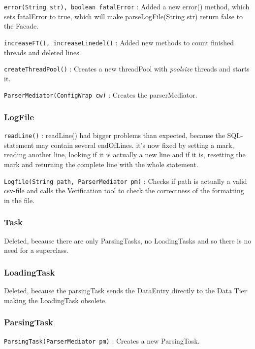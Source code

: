 \texttt{error(String str), boolean fatalError} : Added a new error() method, which sets fatalError to true, which will 
make parseLogFile(String str) return false to the Facade.\newline

\texttt{increaseFT(), increaseLinedel()} : Added new methods to count finished threads and deleted lines. \newline

\texttt{createThreadPool()} : Creates a new threadPool with \textit{poolsize} threads and starts it. \newline

\texttt{ParserMediator(ConfigWrap cw)} : Creates the parserMediator.

\subsubsection{LogFile} 

\texttt{readLine()} : readLine() had bigger problems than expected, because the SQL-statement may contain several endOfLines. it's now 
fixed by setting a mark, reading another line, looking if it is actually a new line and if it is, resetting the mark and returning
the complete line with the whole statement. \newline

\texttt{Logfile(String path, ParserMediator pm)} : Checks if path is actually a valid csv-file and calls the Verification tool to check the
correctness of the formatting in the file.

\subsubsection{Task}

Deleted, because there are only ParsingTasks, no LoadingTasks and so there is no need for a superclass.

\subsubsection{LoadingTask}

Deleted, because the parsingTask sends the DataEntry directly to the Data Tier making the LoadingTask obsolete.

\subsubsection{ParsingTask}

\texttt{ParsingTask(ParserMediator pm)} : Creates a new ParsingTask.\newline


